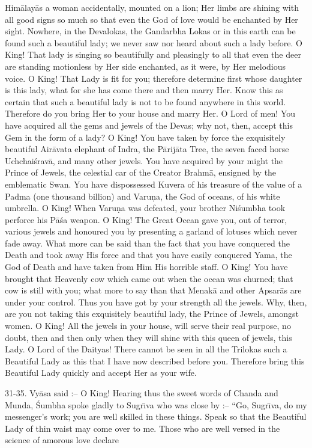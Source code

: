 Him\=alay\=as a woman accidentally, mounted on a lion; Her limbs are shining with all good signs so much so that even the God of love would be enchanted by Her sight. Nowhere, in the Devalokas, the Gandarbha Lokas or in this earth can be found such a beautiful lady; we never saw nor heard about such a lady before. O King! That lady is singing so beautifully and pleasingly to all that even the deer are standing motionless by Her side enchanted, as it were, by Her melodious voice. O King! That Lady is fit for you; therefore determine first whose daughter is this lady, what for she has come there and then marry Her. Know this as certain that such a beautiful lady is not to be found anywhere in this world. Therefore do you bring Her to your house and marry Her. O Lord of men! You have acquired all the gems and jewels of the Devas; why not, then, accept this Gem in the form of a lady? O King! You have taken by force the exquisitely beautiful Air\=avata elephant of Indra, the P\=arij\=ata Tree, the seven faced horse Uchchai\'srav\=a, and many other jewels. You have acquired by your might the Prince of Jewels, the celestial car of the Creator Brahm\=a, ensigned by the emblematic Swan. You have dispossessed Kuvera of his treasure of the value of a Padma (one thousand billion) and Varu\d{n}a, the God of oceans, of his white umbrella. O King! When Varu\d{n}a was defeated, your brother Ni\'sumbha took perforce his P\=a\'sa weapon. O King! The Great Ocean gave you, out of terror, various jewels and honoured you by presenting a garland of lotuses which never fade away. What more can be said than the fact that you have conquered the Death and took away His force and that you have easily conquered Yama, the God of Death and have taken from Him His horrible staff. O King! You have brought that Heavenly cow which came out when the ocean was churned; that cow is still with you; what more to say than that Menak\=a and other Apsar\=as are under your control. Thus you have got by your strength all the jewels. Why, then, are you not taking this exquisitely beautiful lady, the Prince of Jewels, amongst women. O King! All the jewels in your house, will serve their real purpose, no doubt, then and then only when they will shine with this queen of jewels, this Lady. O Lord of the Daityas! There cannot be seen in all the Trilokas such a Beautiful Lady as this that I have now described before you. Therefore bring this Beautiful Lady quickly and accept Her as your wife.

31-35. Vy\=asa said :-- O King! Hearing thus the sweet words of Chanda and Munda, \'Sumbha spoke gladly to Sugr\={\i}va who was close by :-- ``Go, Sugr\={\i}va, do my messenger's work; you are well skilled in these things. Speak so that the Beautiful Lady of thin waist may come over to me. Those who are well versed in the science of amorous love declare

